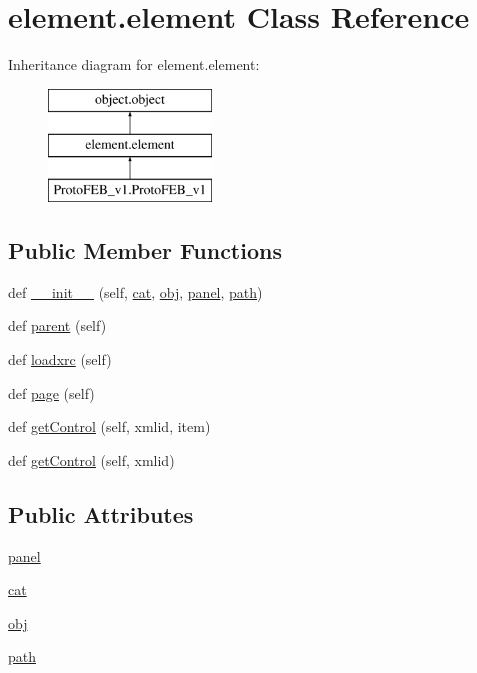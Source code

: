 \hypertarget{classelement_1_1element}{}\section{element.\+element Class Reference}
\label{classelement_1_1element}
Inheritance diagram for element.\+element\+:\begin{figure}[H]
\begin{center}
\leavevmode
\includegraphics[height=3.000000cm]{classelement_1_1element}
\end{center}
\end{figure}
\subsection*{Public Member Functions}
\begin{DoxyCompactItemize}
\item 
def \hyperlink{classelement_1_1element_a72de0f0e7b950dabca314ed77552cb90}{\+\_\+\+\_\+init\+\_\+\+\_\+} (self, \hyperlink{classobject_1_1object_af114388a80cca208c152ffeca0e89e23}{cat}, \hyperlink{classobject_1_1object_a82b61e7cd7e18b1f9de10fc832e5b75e}{obj}, \hyperlink{classelement_1_1element_a0fce7cee12f437717c882d0965e46235}{panel}, \hyperlink{classobject_1_1object_a2a518f960961d791b0f900a90c3cd287}{path})
\item 
def \hyperlink{classelement_1_1element_a2705e2b608db596bedf2a206bda42d12}{parent} (self)
\item 
def \hyperlink{classelement_1_1element_aa9fadd76b299e1dfddd1da112dfe8245}{loadxrc} (self)
\item 
def \hyperlink{classelement_1_1element_a80c5e09b291c255b740787b87760fca0}{page} (self)
\item 
def \hyperlink{classobject_1_1object_a54a55487254a96ed2fe367439c41391f}{get\+Control} (self, xmlid, item)
\item 
def \hyperlink{classobject_1_1object_a22a9d1ff67cd6e990cf1b63ed49c50e4}{get\+Control} (self, xmlid)
\end{DoxyCompactItemize}
\subsection*{Public Attributes}
\begin{DoxyCompactItemize}
\item 
\hyperlink{classelement_1_1element_a0fce7cee12f437717c882d0965e46235}{panel}
\item 
\hyperlink{classobject_1_1object_af114388a80cca208c152ffeca0e89e23}{cat}
\item 
\hyperlink{classobject_1_1object_a82b61e7cd7e18b1f9de10fc832e5b75e}{obj}
\item 
\hyperlink{classobject_1_1object_a2a518f960961d791b0f900a90c3cd287}{path}
\end{DoxyCompactItemize}


